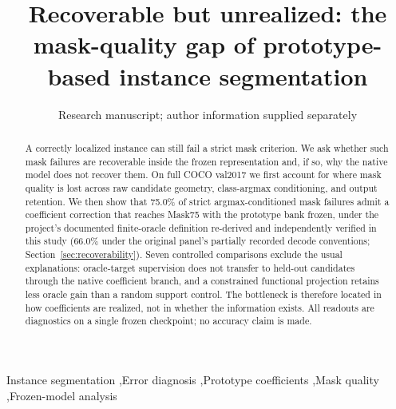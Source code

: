 ﻿\documentclass[times,twocolumn,final,authoryear]{elsarticle}
\begin{document}
\begin{frontmatter}
\title{Recoverable but unrealized: the mask-quality gap of prototype-based instance segmentation}
\author{Research manuscript; author information supplied separately}
\begin{abstract}
A correctly localized instance can still fail a strict mask criterion. We ask whether such mask
failures are recoverable inside the frozen representation and, if so, why the native model does not
recover them. On full COCO val2017 we first account for where mask quality is lost across raw
candidate geometry, class-argmax conditioning, and output retention. We then show that
75.0\% of strict argmax-conditioned mask failures admit a coefficient correction that
reaches Mask75 with the prototype bank frozen, under the project's documented finite-oracle
definition re-derived and independently verified in this study (66.0\% under the original panel's
partially recorded decode conventions; Section~\ref{sec:recoverability}). Seven controlled
comparisons exclude the usual
explanations: oracle-target supervision does not transfer to held-out candidates through the native
coefficient branch, and a constrained functional projection retains less oracle gain than a random
support control. The bottleneck is therefore located in how coefficients are realized, not in
whether the information exists. All readouts are diagnostics on a single frozen checkpoint; no
accuracy claim is made.
\end{abstract}
\begin{keyword}
Instance segmentation \sep Error diagnosis \sep Prototype coefficients \sep Mask quality \sep Frozen-model analysis
\end{keyword}
\end{frontmatter}
\end{document}
